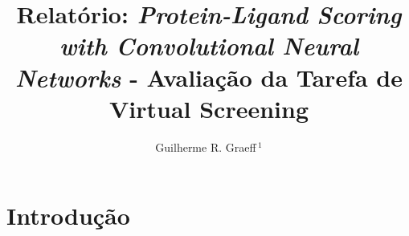 \documentclass[utf8]{frontiersSCNS} %
\def\keyFont{\fontsize{8}{11}\helveticabold }
\def\firstAuthorLast{} %
\def\Authors{Guilherme R. Graeff\,$^{1}$}
\begin{document}
\onecolumn
{}

\title[Relatório]{Relatório: \textit{Protein-Ligand Scoring with Convolutional Neural Networks} - Avaliação da Tarefa de Virtual Screening} 

\author[\firstAuthorLast ]{\Authors} %
\address{} %
\correspondance{} %

\extraAuth{}%


\maketitle












\section{Introdução}
\end{document}
